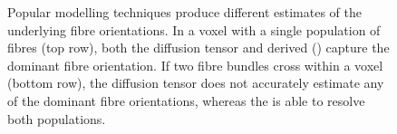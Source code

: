 \documentclass[12pt,phd,a4paper,twoside]{ucl_thesis}
\begin{document}
\begin{figure}
  \centering
  
  \caption[Fibre orientation distribution modelling: Comparison between diffusion tensor and constrained spherical deconvolution]{Popular  modelling techniques produce different estimates of the underlying fibre orientations. In a voxel with a single population of fibres (top row), both the diffusion tensor and  derived  () capture the dominant fibre orientation. If two fibre bundles cross within a voxel (bottom row), the diffusion tensor does not accurately estimate any of the dominant fibre orientations, whereas the  is able to resolve both populations.}
  \label{fig:cross}
\end{figure}
\end{document}
